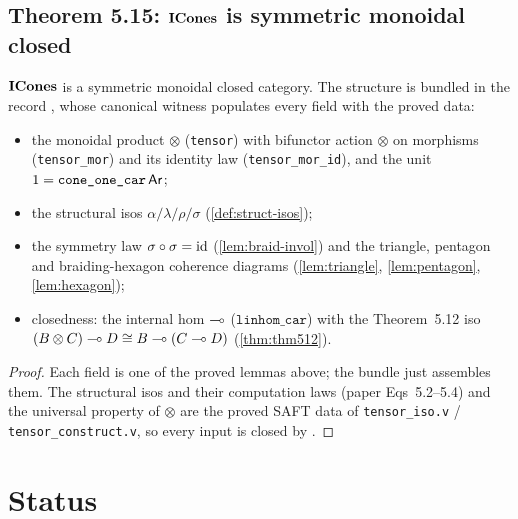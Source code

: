 \subsection{Theorem 5.15: \texorpdfstring{$\mathbf{ICones}$}{ICones} is symmetric monoidal closed}%
\label{sec:thm515}

\begin{theorem}\label{thm:thm515}
\rocqok
{}
$\mathbf{ICones}$ is a symmetric monoidal closed category. The structure is
bundled in the record
, whose canonical witness
 populates every field with the
proved data:
\begin{itemize}
  \item the monoidal product $\otimes$ (\texttt{tensor}) with bifunctor
    action $\otimes$ on morphisms (\texttt{tensor\_mor}) and its
    identity law (\texttt{tensor\_mor\_id}), and the unit $1 =
    \texttt{cone\_one\_car}\,\mathsf{Ar}$;
  \item the structural isos $\alpha/\lambda/\rho/\sigma$
    (\autoref{def:struct-isos});
  \item the symmetry law $\sigma \circ \sigma = \mathrm{id}$
    (\autoref{lem:braid-invol}) and the triangle, pentagon and
    braiding-hexagon coherence diagrams
    (\autoref{lem:triangle}, \autoref{lem:pentagon},
    \autoref{lem:hexagon});
  \item closedness: the internal hom $\multimap$ ($\texttt{linhom\_car}$)
    with the Theorem~5.12 iso $(B \otimes C) \multimap D \cong B \multimap (C
    \multimap D)$ (\autoref{thm:thm512}).
\end{itemize}
\end{theorem}

\begin{proof}
Each field is one of the proved lemmas above; the bundle
 just assembles them. The structural
isos and their computation laws (paper Eqs~5.2--5.4) and the universal
property of $\otimes$ are the proved SAFT data of \texttt{tensor\_iso.v}
/ \texttt{tensor\_construct.v}, so every input is closed by \Qed{}.
\end{proof}

\section{Status}\label{sec:tensor-status}

